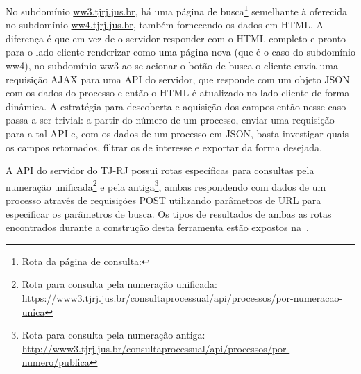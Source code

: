 No subdomínio \url{ww3.tjrj.jus.br}, há uma página de
busca\footnote{Rota da página de consulta: \urlConsultaJson} semelhante à oferecida no subdomínio
\url{ww4.tjrj.jus.br}, também fornecendo os dados em HTML. A diferença é que em
vez de o servidor responder com o HTML completo e pronto para o lado cliente
renderizar como uma página nova (que é o caso do subdomínio ww4), no subdomínio
ww3 ao se acionar o botão de busca o cliente envia uma requisição AJAX para uma
API do servidor, que responde com um objeto JSON com os dados do processo e
então o HTML é atualizado no lado cliente de forma dinâmica. A estratégia para
descoberta e aquisição dos campos então nesse caso passa a ser trivial: a
partir do número de um processo, enviar uma requisição para a tal API e, com os
dados de um processo em JSON, basta investigar quais os campos retornados,
filtrar os de interesse e exportar da forma desejada.

A API do servidor do TJ-RJ possui rotas específicas para consultas pela
numeração unificada\footnote{Rota para consulta pela numeração unificada:
\url{https://www3.tjrj.jus.br/consultaprocessual/api/processos/por-numeracao-unica}}
e pela antiga\footnote{Rota para consulta pela numeração antiga:
\url{http://www3.tjrj.jus.br/consultaprocessual/api/processos/por-numero/publica}},
ambas respondendo com dados de um processo através de requisições POST
utilizando parâmetros de URL para especificar os parâmetros de busca. Os tipos
de resultados de ambas as rotas encontrados durante a construção desta
ferramenta estão expostos na~.

